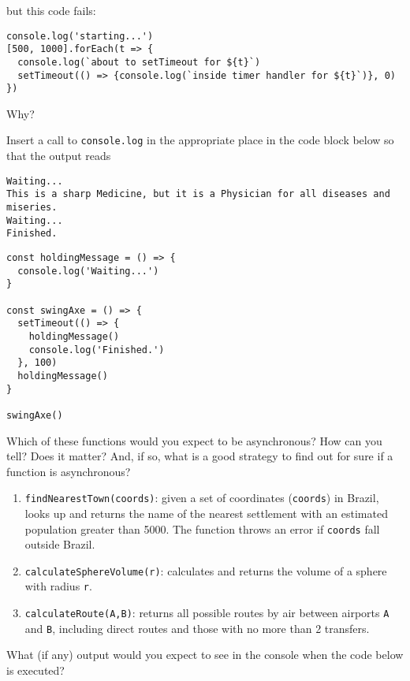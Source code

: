\noindent
but this code fails:

\begin{verbatim}
console.log('starting...')
[500, 1000].forEach(t => {
  console.log(`about to setTimeout for ${t}`)
  setTimeout(() => {console.log(`inside timer handler for ${t}`)}, 0)
})
\end{verbatim}

Why?


Insert a call to \texttt{console.log} in the appropriate place in the code block below
so that the output reads

\begin{verbatim}
Waiting...
This is a sharp Medicine, but it is a Physician for all diseases and miseries.
Waiting...
Finished.
\end{verbatim}

\begin{verbatim}
const holdingMessage = () => {
  console.log('Waiting...')
}

const swingAxe = () => {
  setTimeout(() => {
    holdingMessage()
    console.log('Finished.')
  }, 100)
  holdingMessage()
}

swingAxe()
\end{verbatim}


Which of these functions would you expect to be asynchronous?
How can you tell?
Does it matter?
And, if so, what is a good strategy to find out for sure if a function is asynchronous?

\begin{enumerate}
\item
  \texttt{findNearestTown(coords)}: given a set of coordinates (\texttt{coords}) in Brazil,
  looks up and returns the name of the nearest settlement with an estimated population greater than 5000.
  The function throws an error if \texttt{coords} fall outside Brazil.
\item
  \texttt{calculateSphereVolume(r)}: calculates and returns the volume of a sphere with radius \texttt{r}.
\item
  \texttt{calculateRoute(A,B)}: returns all possible routes by air between airports \texttt{A} and \texttt{B},
  including direct routes and those with no more than 2 transfers.
\end{enumerate}


What (if any) output would you expect to see in the console
when the code below is executed?

